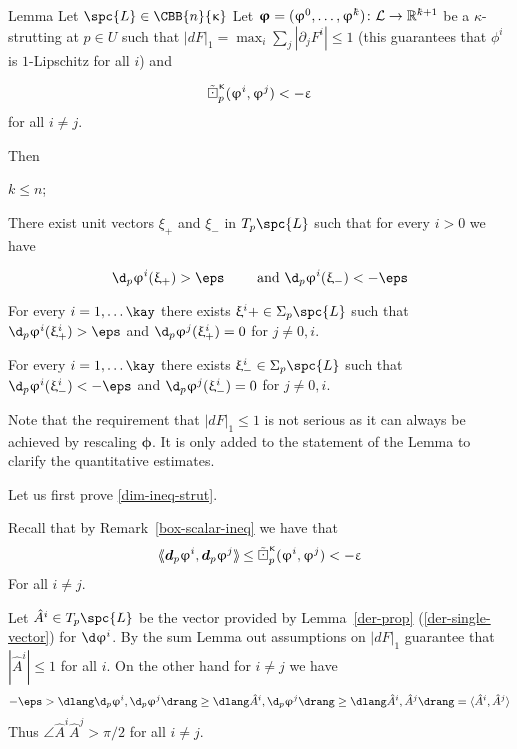 \begin{thm}{Lemma}\label{lem-tight-diff-new}
Let $\spc{L}\in \CBB{n}{\kappa}$ 
Let  $\bm\phi =(\phi^0,\ldots,\phi^\kay)\: \spc{L}\to\RR^{\kay+1}$ be a $\kappa$-strutting at $p\in U$ such that $|dF|_1=\max_i\sum_j|\partial _jF^i|\le 1$ 
(this guarantees that $\phi^i$ is $1$-Lipschitz for all $i$) and 

\[\tilde\boxdot^{\upkappa}_p({\upvarphi^i},{\upvarphi^j})<-\upvarepsilon\]
for all $i\not=j$.

Then 

\begin{subthm}{}\label{dim-ineq-strut}
 $k\le n$;
\end{subthm}


\begin{subthm}{}\label{incr-decr-all}
There exist unit vectors $\xi_+$ and $\xi_-$ in $T_p\spc{L}$ such that for every $i>0$ we have

\[
\d_p\phi^i(\xi_+)>\eps\qquad \text{ and } \d_p\phi^i(\xi_-)<-\eps
\]
\end{subthm}


\begin{subthm}{} \label{pos-eps}
 For every $i=1,\ldots \kay$ there exists $\xi^i+\in \Sigma_p\spc{L}$ such that $\d_p\phi^i(\xi^i_+)> \eps$ and $\d_p\phi^j(\xi^i_+)=0$ for $j\ne 0, i$.
\end{subthm}
\begin{subthm}{} \label{neg-eps}
 For every $i=1,\ldots \kay$ there exists $\xi^i_-\in \Sigma_p\spc{L}$ such that $\d_p\phi^i(\xi^i_-) <- \eps$ and $\d_p\phi^j(\xi^i_-)=0$ for $j\ne 0, i$.
\end{subthm}
\end{thm}
 Note that the requirement that $|dF|_1\le 1$ is not serious as it can always be achieved by rescaling $\bm{\phi}$. It is only added to the statement of the Lemma to clarify the quantitative estimates.
 
 
 Let us first prove \eqref{dim-ineq-strut}. 
 
  Recall that by Remark~\ref{box-scalar-ineq}  we have that 
 \[
\dlang \d_p\phi^i, \d_p\phi^j\drang\le \sdk\kappa{p}{\phi^i}{\phi^j}<-\eps
\]
For all $i\ne j$.

  Let $\hat A^i\in T_p\spc{L}$ be the vector provided by Lemma~\ref{der-prop} (\ref{der-single-vector}) for $\d\phi^i$.  By the sum Lemma out assumptions on $|dF|_1$ guarantee that $|\hat A^i|\le 1$ for all $i$.
 On the other hand for $i\ne j$ we have 
 \[
 -\eps>\dlang \d_p\phi^i, \d_p\phi^j\drang\ge \dlang \hat A^i, \d_p\phi^j\drang\ge \dlang  \hat A^i, \hat A^j\drang=\langle  \hat A^i, \hat A^j\rangle
 \]
 Thus $\angle \hat A^i\hat A^j>\pi/2$ for all $i\ne j$.
 
